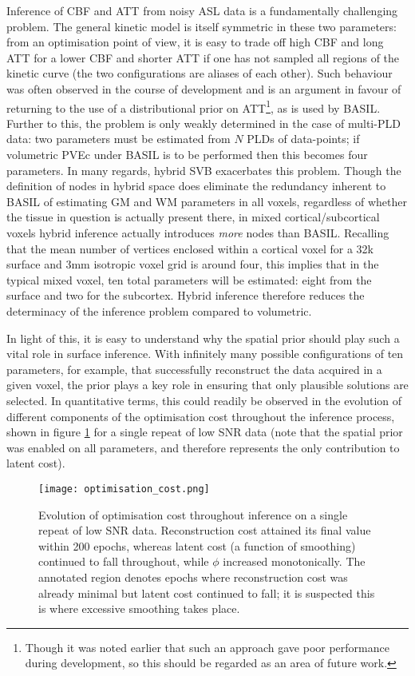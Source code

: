 Inference of CBF and ATT from noisy ASL data is a fundamentally challenging problem. The general kinetic model is itself symmetric in these two parameters: from an optimisation point of view, it is easy to trade off high CBF and long ATT for a lower CBF and shorter ATT if one has not sampled all regions of the kinetic curve (the two configurations are aliases of each other). Such behaviour was often observed in the course of development and is an argument in favour of returning to the use of a distributional prior on ATT\footnote{Though it was noted earlier that such an approach gave poor performance during development, so this should be regarded as an area of future work.}, as is used by BASIL. Further to this, the problem is only weakly determined in the case of multi-PLD data: two parameters must be estimated from $N$ PLDs of data-points; if volumetric PVEc under BASIL is to be performed then this becomes four parameters. In many regards, hybrid SVB exacerbates this problem. Though the definition of nodes in hybrid space does eliminate the redundancy inherent to BASIL of estimating GM and WM parameters in all voxels, regardless of whether the tissue in question is actually present there, in mixed cortical/subcortical voxels hybrid inference actually introduces \textit{more} nodes than BASIL. Recalling that the mean number of vertices enclosed within a cortical voxel for a 32k surface and 3mm isotropic voxel grid is around four, this implies that in the typical mixed voxel, ten total parameters will be estimated: eight from the surface and two for the subcortex. Hybrid inference therefore reduces the determinacy of the inference problem compared to volumetric. 

In light of this, it is easy to understand why the spatial prior should play such a vital role in surface inference. With infinitely many possible configurations of ten parameters, for example, that successfully reconstruct the data acquired in a given voxel, the prior plays a key role in ensuring that only plausible solutions are selected. In quantitative terms, this could readily be observed in the evolution of different components of the optimisation cost throughout the inference process, shown in figure \ref{optimisation_cost} for a single repeat of low SNR data (note that the spatial prior was enabled on all parameters, and therefore represents the only contribution to latent cost). 

\begin{figure}[H]
\centering
\texttt{[image: optimisation\_cost.png]}
\caption{Evolution of optimisation cost throughout inference on a single repeat of low SNR data. Reconstruction cost attained its final value within 200 epochs, whereas latent cost (a function of smoothing) continued to fall throughout, while $\phi$ increased monotonically. The annotated region denotes epochs where reconstruction cost was already minimal but latent cost continued to fall; it is suspected this is where excessive smoothing takes place.}
\label{optimisation_cost} 
\end{figure}

